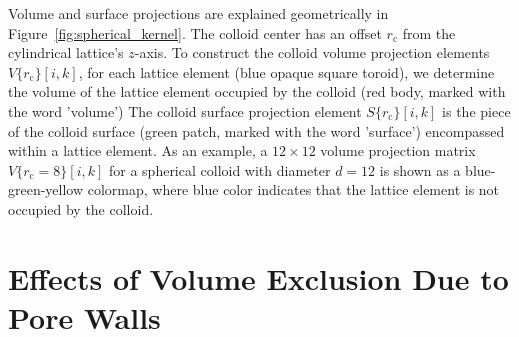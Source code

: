 \documentclass[10pt, a4paper]{article}
\begin{document}
\begin{multicols}{2}
Volume and surface projections are explained geometrically in Figure~\ref{fig:spherical_kernel}.
The colloid center has an offset $r_{\text{c}}$ from the cylindrical lattice's $z$-axis.
To construct the colloid volume projection elements $V\{r_{\text{c}}\}[i, k]$, for each lattice element (blue opaque square toroid), we determine the volume of the lattice element occupied by the colloid (red body, marked with the word 'volume')
The colloid surface projection element $S\{r_{\text{c}}\}[i, k]$ is the piece of the colloid surface (green patch, marked with the word 'surface') encompassed within a lattice element.
As an example, a $12 \times 12$ volume projection matrix $V\{r_{\text{c}} = 8\}[i, k]$ for a spherical colloid with diameter $d = 12$ is shown as a blue-green-yellow colormap, where blue color indicates that the lattice element is not occupied by the colloid.

\end{multicols}

\section{Effects of Volume Exclusion Due to Pore Walls}

\end{document}
